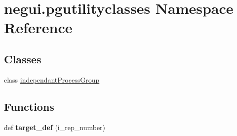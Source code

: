 \hypertarget{namespacenegui_1_1pgutilityclasses}{}\section{negui.\+pgutilityclasses Namespace Reference}
\label{namespacenegui_1_1pgutilityclasses}
\subsection*{Classes}
\begin{DoxyCompactItemize}
\item 
class \hyperlink{classnegui_1_1pgutilityclasses_1_1independantProcessGroup}{independant\+Process\+Group}
\end{DoxyCompactItemize}
\subsection*{Functions}
\begin{DoxyCompactItemize}
\item 
def {\bfseries target\+\_\+def} (i\+\_\+rep\+\_\+number)\hypertarget{namespacenegui_1_1pgutilityclasses_a3535192e3dbbe0f22fe5ae7f077d3304}{}\label{namespacenegui_1_1pgutilityclasses_a3535192e3dbbe0f22fe5ae7f077d3304}

\end{DoxyCompactItemize}
